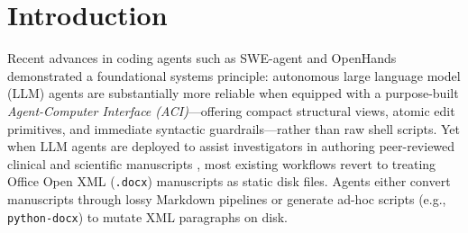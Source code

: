 \documentclass[11pt,a4paper]{article}
\begin{document}
\section{Introduction}
\label{sec:intro}

Recent advances in coding agents such as SWE-agent \cite{yang2024sweagent} and OpenHands \cite{wang2024openhands} demonstrated a foundational systems principle: autonomous large language model (LLM) agents are substantially more reliable when equipped with a purpose-built \emph{Agent-Computer Interface (ACI)}---offering compact structural views, atomic edit primitives, and immediate syntactic guardrails---rather than raw shell scripts. Yet when LLM agents are deployed to assist investigators in authoring peer-reviewed clinical and scientific manuscripts \cite{schulz2010consort,vandenbroucke2007strobe,lee2022coauthor}, most existing workflows revert to treating Office Open XML (\texttt{.docx}) \cite{ecma376ooxml} manuscripts as static disk files. Agents either convert manuscripts through lossy Markdown pipelines or generate ad-hoc scripts (e.g., \texttt{python-docx}) to mutate XML paragraphs on disk.
\end{document}

